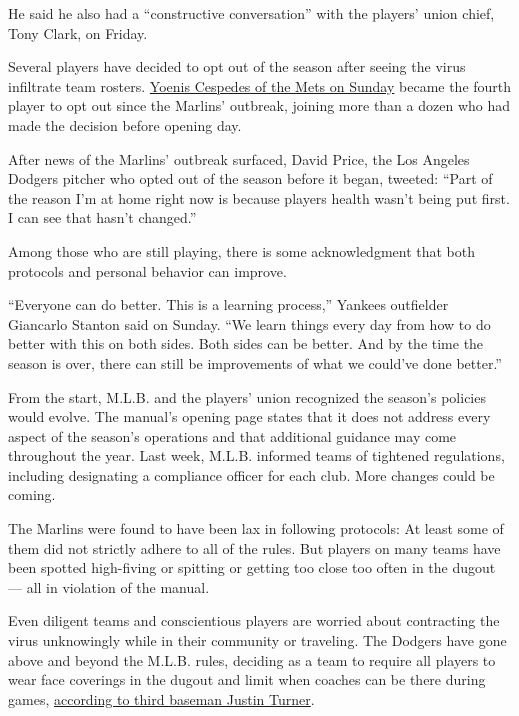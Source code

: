 He said he also had a ``constructive conversation'' with the players'
union chief, Tony Clark, on Friday.

Several players have decided to opt out of the season after seeing the
virus infiltrate team rosters.
\href{https://www.nytimes3xbfgragh.onion/2020/08/02/sports/baseball/Yoenis-cespedes-opt-out-rule.html}{Yoenis
Cespedes of the Mets on Sunday} became the fourth player to opt out
since the Marlins' outbreak, joining more than a dozen who had made the
decision before opening day.

After news of the Marlins' outbreak surfaced, David Price, the Los
Angeles Dodgers pitcher who opted out of the season before it began,
tweeted: ``Part of the reason I'm at home right now is because players
health wasn't being put first. I can see that hasn't changed.''

Among those who are still playing, there is some acknowledgment that
both protocols and personal behavior can improve.

``Everyone can do better. This is a learning process,'' Yankees
outfielder Giancarlo Stanton said on Sunday. ``We learn things every day
from how to do better with this on both sides. Both sides can be better.
And by the time the season is over, there can still be improvements of
what we could've done better.''

From the start, M.L.B. and the players' union recognized the season's
policies would evolve. The manual's opening page states that it does not
address every aspect of the season's operations and that additional
guidance may come throughout the year. Last week, M.L.B. informed teams
of tightened regulations, including designating a compliance officer for
each club. More changes could be coming.

The Marlins were found to have been lax in following protocols: At least
some of them did not strictly adhere to all of the rules. But players on
many teams have been spotted high-fiving or spitting or getting too
close too often in the dugout --- all in violation of the manual.

Even diligent teams and conscientious players are worried about
contracting the virus unknowingly while in their community or traveling.
The Dodgers have gone above and beyond the M.L.B. rules, deciding as a
team to require all players to wear face coverings in the dugout and
limit when coaches can be there during games,
\href{https://twitter.com/alannarizzo/status/1289371846425550848}{according
to third baseman Justin Turner}.

